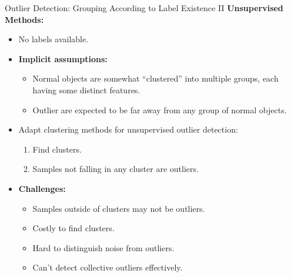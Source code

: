 \begin{frame}{Outlier Detection: Grouping According to Label Existence II}
	\textcolor{faugray}{\textbf{Unsupervised Methods:}}

	\begin{itemize}
		\item No labels available.
		\item \textbf{Implicit assumptions:}
		      \begin{itemize}
			      \item \textcolor{faugray}{Normal objects are somewhat ``clustered''} into multiple groups, each having some distinct features.
			      \item Outlier are expected to be far away from any group of normal objects.
		      \end{itemize}
		\item Adapt clustering methods for unsupervised outlier detection:
		      \begin{enumerate}
			      \item Find clusters.
			      \item Samples not falling in any cluster are outliers.
		      \end{enumerate}
		\item \textbf{Challenges:}
		      \begin{itemize}
			      \item Samples outside of clusters may not be outliers.
			      \item Costly to find clusters.
			      \item Hard to distinguish noise from outliers.
			      \item Can't detect collective outliers effectively.
		      \end{itemize}
	\end{itemize}
\end{frame}


